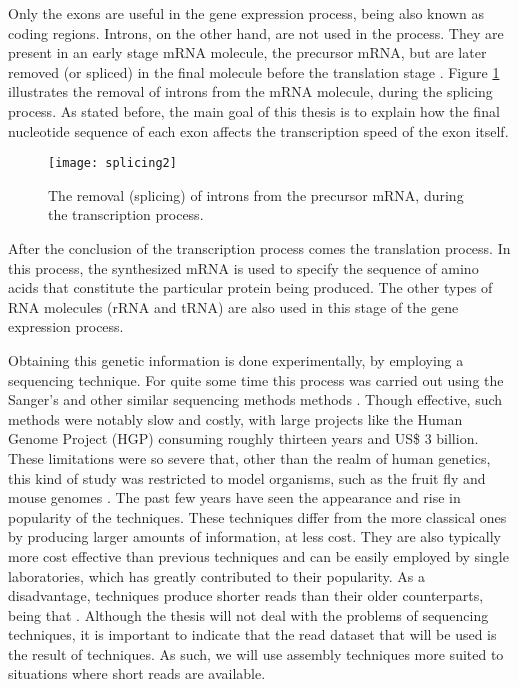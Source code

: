 Only the exons are useful in the gene expression process, being also known as
coding regions. Introns, on the other hand, are not used in the process. They
are present in an early stage mRNA molecule, the precursor mRNA, but are later
removed (or spliced) in the final molecule before the translation stage
\cite{leic:gene_expr}. Figure \ref{fig:splicing} illustrates the removal of
introns from the mRNA molecule, during the  splicing process. As stated before,
the main goal of this thesis is to explain how the final nucleotide sequence of
each exon affects the transcription speed of the exon itself.

\begin{figure}[!htb]
  \begin{center}
    \leavevmode
    \texttt{[image: splicing2]}
    \caption[Removal of introns from precursor mRNA]{The removal (splicing) of
    introns from the precursor mRNA, during the transcription process.}
    \label{fig:splicing}
  \end{center}
\end{figure}

After the conclusion of the transcription process comes the translation process.
In this process, the synthesized mRNA is used to specify the sequence of amino
acids that constitute the particular protein being produced. The other types of
RNA molecules (rRNA and tRNA) are also used in this stage of the gene expression
process.

Obtaining this genetic information is done experimentally, by employing a
sequencing technique. For quite some time this process was carried out using
the Sanger's and other similar sequencing methods methods
\cite{Reis-Filho2009}. Though effective, such methods were notably slow and
costly, with large projects like the Human Genome Project (HGP) consuming
roughly thirteen years and US\$ 3 billion. These limitations were so severe
that, other than the realm of human genetics, this kind of study was restricted
to model organisms, such as the fruit fly and mouse genomes \cite{Wolf2013}.
The past few years have seen the appearance and rise in popularity of the
\ngs{} techniques. These techniques differ from the more classical ones by
producing larger amounts of information, at less cost. They are also typically
more cost effective than previous techniques and can be easily employed by
single laboratories, which has greatly contributed to their popularity. As a
disadvantage, \ngs{} techniques produce shorter reads than their older
counterparts, being that  \cite[p.
671]{Martin2011}. Although the thesis will not deal with the problems of
sequencing techniques, it is important to indicate that the read dataset that
will be used is the result of \ngs{} techniques. As such, we will use assembly
techniques more suited to situations where short reads are available.

